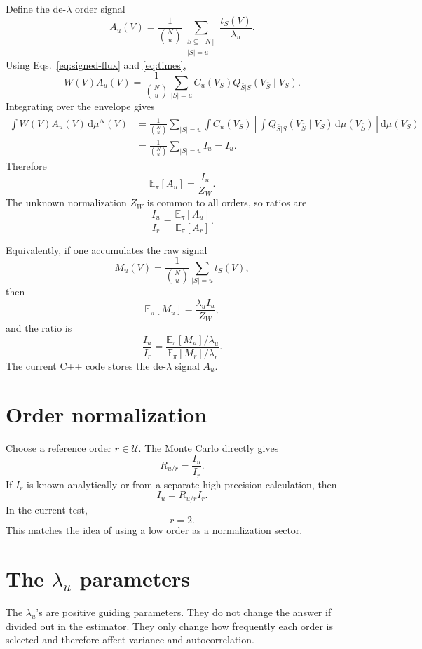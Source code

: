\documentclass[11pt]{article}
\newcommand{\dd}{\mathrm{d}}
\newcommand{\E}{\mathbb{E}}
\newcommand{\1}{\mathbf{1}}
\newcommand{\calU}{\mathcal{U}}
\newcommand{\card}[1]{\left|#1\right|}
\begin{document}
Define the de-\(\lambda\) order signal
\[
  A_u(V)
  =
  \frac{1}{\binom{N}{u}}
  \sum_{\substack{S\subseteq[N]\\\card{S}=u}}
  \frac{t_S(V)}{\lambda_u}.
  \label{eq:order-signal}
\]
Using Eqs.~\eqref{eq:signed-flux} and \eqref{eq:times},
\[
  W(V)A_u(V)
  =
  \frac{1}{\binom{N}{u}}
  \sum_{\card{S}=u}
  C_u(V_S)
  Q_{\bar S|S}(V_{\bar S}\mid V_S).
\]
Integrating over the envelope gives
\begin{align}
  \int W(V)A_u(V)\,\dd\mu^N(V)
  &=
  \frac{1}{\binom{N}{u}}
  \sum_{\card{S}=u}
  \int C_u(V_S)
  \left[
  \int Q_{\bar S|S}(V_{\bar S}\mid V_S)\,\dd\mu(V_{\bar S})
  \right]
  \dd\mu(V_S)
  \nonumber\\
  &=
  \frac{1}{\binom{N}{u}}
  \sum_{\card{S}=u}
  I_u
  =
  I_u.
\end{align}
Therefore
\[
  \E_{\pi}[A_u]=\frac{I_u}{Z_W}.
\]
The unknown normalization \(Z_W\) is common to all orders, so ratios are
\[
  \frac{I_u}{I_r}
  =
  \frac{\E_\pi[A_u]}{\E_\pi[A_r]}.
\]

Equivalently, if one accumulates the raw signal
\[
  M_u(V)
  =
  \frac{1}{\binom{N}{u}}
  \sum_{\card{S}=u}t_S(V),
\]
then
\[
  \E_\pi[M_u]=\frac{\lambda_u I_u}{Z_W},
\]
and the ratio is
\[
  \frac{I_u}{I_r}
  =
  \frac{\E_\pi[M_u]/\lambda_u}{\E_\pi[M_r]/\lambda_r}.
\]
The current C++ code stores the de-\(\lambda\) signal \(A_u\).

\section{Order normalization}

Choose a reference order \(r\in\calU\).  The Monte Carlo directly gives
\[
  R_{u/r}
  =
  \frac{I_u}{I_r}.
\]
If \(I_r\) is known analytically or from a separate high-precision calculation,
then
\[
  I_u=R_{u/r}I_r.
\]
In the current test,
\[
  r=2.
\]
This matches the idea of using a low order as a normalization sector.

\section{The \texorpdfstring{$\lambda_u$}{lambda} parameters}

The \(\lambda_u\)'s are positive guiding parameters.  They do not change the
answer if divided out in the estimator.  They only change how frequently each
order is selected and therefore affect variance and autocorrelation.
\end{document}
